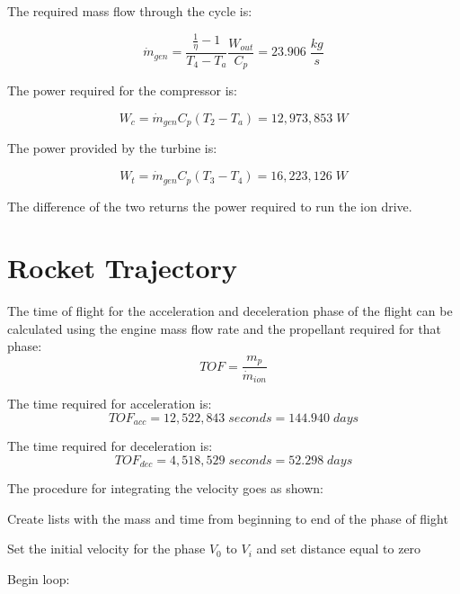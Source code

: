 \documentclass[journal ]{new-aiaa}
\begin{document}
\noindent The required mass flow through the cycle is:

\begin{equation}
    \dot{m}_{gen} = \frac{\frac{1}{\eta}-1}{T_4-T_a}  \frac{W_{out}}{C_p} = \boxed{23.906\;\frac{kg}{s}}
\end{equation}

\noindent The power required for the compressor is:

\begin{equation}
    W_c = \dot{m}_{gen} C_p \left(T_2 - T_a\right)
    = \boxed{12,973,853\;W}
\end{equation}

\noindent The power provided by the turbine is:

\begin{equation}
    W_t = \dot{m}_{gen} C_p \left(T_3 - T_4\right)
    = \boxed{16,223,126\;W}
\end{equation}

\noindent The difference of the two returns the power required to run the ion drive.
\pagebreak 
\section{Rocket Trajectory}

\noindent The time of flight for the acceleration and deceleration phase of the flight can be calculated using the engine mass flow rate and the propellant required for that phase:
\begin{equation}
    TOF = \frac{m_p}{\dot{m}_{ion}}
\end{equation}

\noindent The time required for acceleration is:
\begin{equation*}
    TOF_{acc} = \boxed{12,522,843\;seconds= 144.940\;days}
\end{equation*}

\noindent The time required for deceleration is:
\begin{equation*}
    TOF_{dec} = \boxed{4,518,529\;seconds = 52.298\;days}
\end{equation*}


\noindent The procedure for integrating the velocity goes as shown:

\noindent Create lists with the mass and time from beginning to end of the phase of flight

\noindent Set the initial velocity for the phase $V_0$ to $V_i$ and set distance equal to zero

\noindent Begin loop:
\end{document}
